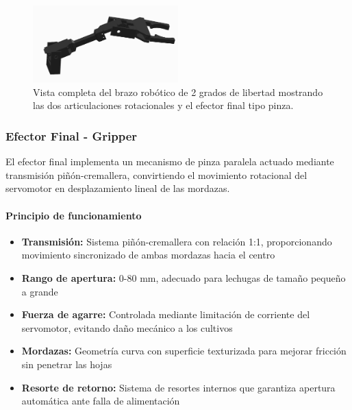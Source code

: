 \begin{figure}[H]
    \centering
    \includegraphics[width=0.5\textwidth]{img/brazo_completo.jpg}
    \caption{Vista completa del brazo robótico de 2 grados de libertad mostrando las dos articulaciones rotacionales y el efector final tipo pinza.}
    \label{fig:brazo_Real}
\end{figure}

\subsubsection{Efector Final - Gripper}

El efector final implementa un mecanismo de pinza paralela actuado mediante transmisión piñón-cremallera, convirtiendo el movimiento rotacional del servomotor en desplazamiento lineal de las mordazas.

\paragraph{Principio de funcionamiento}

\begin{itemize}
    \item \textbf{Transmisión:} Sistema piñón-cremallera con relación 1:1, proporcionando movimiento sincronizado de ambas mordazas hacia el centro
    \item \textbf{Rango de apertura:} 0-80 mm, adecuado para lechugas de tamaño pequeño a grande
    \item \textbf{Fuerza de agarre:} Controlada mediante limitación de corriente del servomotor, evitando daño mecánico a los cultivos
    \item \textbf{Mordazas:} Geometría curva con superficie texturizada para mejorar fricción sin penetrar las hojas
    \item \textbf{Resorte de retorno:} Sistema de resortes internos que garantiza apertura automática ante falla de alimentación
\end{itemize}

